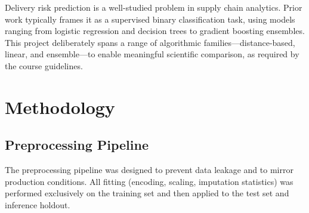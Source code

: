 \documentclass[12pt,a4paper]{article}
\begin{document}
Delivery risk prediction is a well-studied problem in supply chain analytics.
Prior work typically frames it as a supervised binary classification task,
using models ranging from logistic regression and decision trees to gradient
boosting ensembles. This project deliberately spans a range of algorithmic
families---distance-based, linear, and ensemble---to enable meaningful
scientific comparison, as required by the course guidelines.

\section{Methodology}
\label{sec:methodology}

\subsection{Preprocessing Pipeline}

The preprocessing pipeline was designed to prevent data leakage and to mirror
production conditions. All fitting (encoding, scaling, imputation statistics)
was performed exclusively on the training set and then applied to the test set
and inference holdout.
\end{document}
